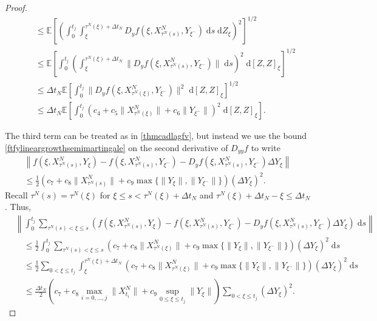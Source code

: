 \documentclass[reqno,12pt]{amsart}
\theoremstyle{plain} %
\theoremstyle{definition} %
\begin{document}
\begin{proof}
\begin{align*}
        & \quad \leq \mathbb{E}\left[\left(\int_0^{t_j} \int_{\xi}^{\tau^N(\xi) + \Delta t_N} D_y f(\xi, X_{\tau^N(s)}^N, Y_{\xi^-}) \;\mathrm{d}s \;\mathrm{d}Z_\xi\right)^2\right]^{1/2} \\
        & \quad \leq \mathbb{E}\left[\int_0^{t_j} \left(\int_{\xi}^{\tau^N(\xi) + \Delta t_N} \|D_y f(\xi, X_{\tau^N(s)}^N, Y_{\xi^-})\| \;\mathrm{d}s\right)^2 \;\mathrm{d}[Z, Z]_\xi\right]^{1/2} \\
        & \quad \leq \Delta t_N\mathbb{E}\left[\int_0^{t_j} \|D_y f(\xi, X_{\tau^N(\xi)}^N, Y_{\xi^-})\|^2 \;\mathrm{d}[Z, Z]_\xi\right]^{1/2} \\
        & \quad \leq \Delta t_N\mathbb{E}\left[\int_0^{t_j} \left(c_4 + c_5\|X_{\tau^N(\xi)}^N\| + c_6 \|Y_{\xi^-}\| \right)^2\;\mathrm{d}[Z, Z]_\xi\right].
    \end{align*}

    The third term can be treated as in \cref{thmcadlagfv}, but instead we use the bound \eqref{ftfylineargrowthsemimartingale} on the second derivative of $D_{yy}f$ to write
    \begin{multline*}
        \left\| f(\xi, X_{\tau^N(s)}^N, Y_\xi) - f(\xi, X_{\tau^N(s)}^N, Y_{\xi^{-}}) - D_y f(\xi, X_{\tau^N(s)}^N, Y_{\xi^-}) \Delta Y_\xi \right\| \\
        \leq \frac{1}{2}\left(c_7 + c_8 \|X_{\tau^N(s)}^N\| + c_9 \max\{\|Y_\xi\|, \|Y_{\xi^-}\|\} \right)\left( \Delta Y_\xi \right)^2.
    \end{multline*}
    Recall $\tau^N(s) = \tau^N(\xi)$ for $\xi \leq s < \tau^N(\xi) + \Delta t_N$ and $\tau^N(\xi) + \Delta t_N- \xi \leq \Delta t_N$. Thus,
    \begin{align*}
        & \left\|\int_0^{t_j} \sum_{\tau^N(s) < \xi \leq s} \left(f(\xi, X_{\tau^N(s)}^N, Y_\xi) - f(\xi, X_{\tau^N(s)}^N, Y_{\xi^{-}}) - D_y f(\xi, X_{\tau^N(s)}^N, Y_{\xi^-})\Delta Y_\xi\right) \;\mathrm{d}s\right\| \\
        & \quad \leq \frac{1}{2}\int_0^{t_j} \sum_{\tau^N(s) < \xi \leq s} \left(c_7 + c_8 \|X_{\tau^N(\xi)}^N\| + c_9 \max\{\|Y_\xi\|, \|Y_{\xi^-}\|\} \right)\left( \Delta Y_\xi \right)^2\;\mathrm{d}s \\
        & \quad \leq \frac{1}{2}\sum_{0 < \xi \leq t_j}\int_\xi^{\tau^N(\xi) + \Delta t_N} \left(c_7 + c_8 \|X_{\tau^N(\xi)}^N\| + c_9 \max\{\|Y_\xi\|, \|Y_{\xi^-}\|\} \right)\left( \Delta Y_\xi \right)^2\;\mathrm{d}s \\
        & \quad \leq \frac{\Delta t_N}{2} \left( c_7 + c_8 \max_{i=0, \ldots, j}\|X_{t_i}^N\| + c_9 \sup_{0\leq \xi \leq t_j}\|Y_\xi\|\right) \sum_{0 < \xi \leq t_j}\left( \Delta Y_\xi \right)^2.
    \end{align*}


\end{proof}
\end{document}
